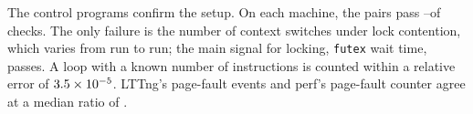 The control programs confirm the setup. On each machine, the
\nControls pairs pass \ctrlPassMin--\ctrlPassMax of \nChecks checks. The
only failure is the number of context switches under lock contention,
which varies from run to run; the main signal for locking, \texttt{futex}
wait time, passes. A loop with a known number of instructions is counted
within a relative error of $3.5\times10^{-5}$. LTTng's page-fault events
and perf's page-fault counter agree at a median ratio of \faultRatioMed.
